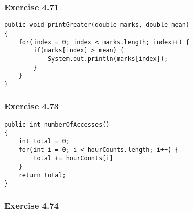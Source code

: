 \subsubsection{Exercise 4.71}
\begin{lstlisting}
public void printGreater(double marks, double mean)
{
    for(index = 0; index < marks.length; index++) {
        if(marks[index] > mean) {
            System.out.println(marks[index]);
        }
    }
}
\end{lstlisting}

\subsubsection{Exercise 4.73}
\begin{lstlisting}
public int numberOfAccesses()
{
    int total = 0;
    for(int i = 0; i < hourCounts.length; i++) {
        total += hourCounts[i]
    }
    return total;
}
\end{lstlisting}

\subsubsection{Exercise 4.74}

